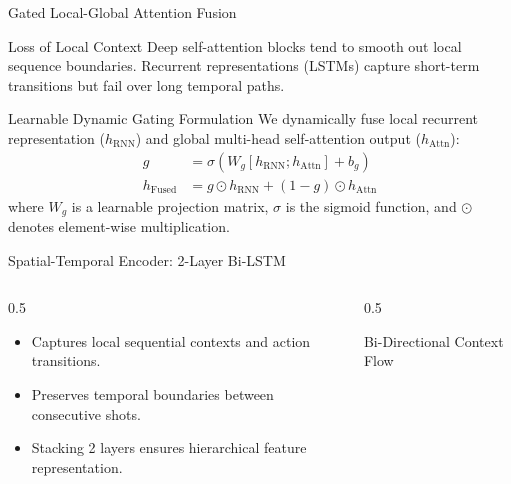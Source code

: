 \documentclass[aspectratio=169]{beamer}
\begin{document}
\begin{frame}{Gated Local-Global Attention Fusion}
    \begin{block}{Loss of Local Context}
        Deep self-attention blocks tend to smooth out local sequence boundaries. Recurrent representations (LSTMs) capture short-term transitions but fail over long temporal paths.
    \end{block}
    
    \begin{block}{Learnable Dynamic Gating Formulation}
        We dynamically fuse local recurrent representation ($h_{\text{RNN}}$) and global multi-head self-attention output ($h_{\text{Attn}}$):
        \begin{align*}
            g &= \sigma(W_g [h_{\text{RNN}}; h_{\text{Attn}}] + b_g) \\
            h_{\text{Fused}} &= g \odot h_{\text{RNN}} + (1 - g) \odot h_{\text{Attn}}
        \end{align*}
        where $W_g$ is a learnable projection matrix, $\sigma$ is the sigmoid function, and $\odot$ denotes element-wise multiplication.
    \end{block}
\end{frame}

\begin{frame}{Spatial-Temporal Encoder: 2-Layer Bi-LSTM}
    \begin{columns}
        \begin{column}{0.5\textwidth}
            \begin{itemize}
                \item Captures local sequential contexts and action transitions.
                \item Preserves temporal boundaries between consecutive shots.
                \item Stacking 2 layers ensures hierarchical feature representation.
            \end{itemize}
        \end{column}
        \begin{column}{0.5\textwidth}
            \begin{block}{Bi-Directional Context Flow}
                \centering
            \end{block}
        \end{column}
    \end{columns}
\end{frame}
\end{document}
